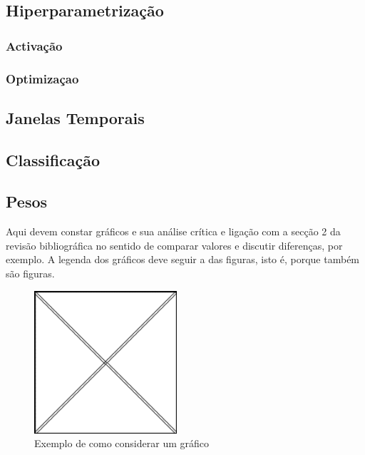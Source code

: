 \subsection{Hiperparametrização \label{se:hiper}}

\subsubsection{Activação\label{se:activ}}

\resizebox{\linewidth}{!}{}

\subsubsection{Optimizaçao\label{se:opt}}


\subsection{Janelas Temporais}
\resizebox{\linewidth}{!}{}

\subsection{Classificação}

\subsection{Pesos}

Aqui devem constar gráficos e sua análise crítica e ligação com a secção 2 da revisão bibliográfica no sentido de comparar valores e discutir diferenças, por exemplo. A legenda dos gráficos deve seguir a das figuras, isto é, porque também são figuras.

\begin{figure}[H]
\centering
\includegraphics[width=150pt, keepaspectratio]{Imagens/FigA.png}
\caption{Exemplo de como considerar um gráfico}
\label{fig:grafico1} %
\end{figure}
